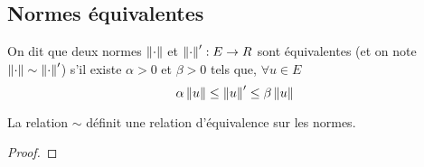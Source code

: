                         \subsection{Normes équivalentes}

                        \begin{definition}
                            On dit que deux normes $\left\lVert\cdot\right\rVert$ et $\left\lVert\cdot\right\rVert': E\to R$  sont équivalentes (et on note $\left\lVert\cdot\right\rVert \sim \left\lVert\cdot\right\rVert'$) s'il existe $\alpha>0$ et $\beta>0$ tels que, $\forall u \in E$
                            \[
                                \alpha \left\lVert u\right\rVert \leq \left\lVert u\right\rVert' \leq \beta \left\lVert u\right\rVert
                            \]
                        \end{definition}

                        \begin{proposition}
                            La relation $\sim$ définit une relation d'équivalence sur les normes. 
                        \end{proposition}

                        \begin{proof}
                            \sld{
                            }
                            \pl{\rep{8cm}}
                        \end{proof}
                        \sld{\vfill\pagebreak[5]}%

